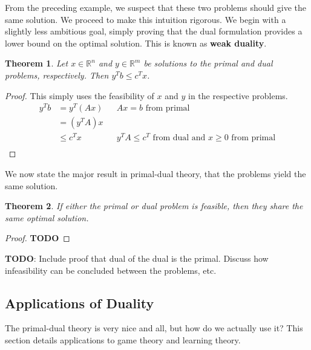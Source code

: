 \documentclass[12pt]{article}
\newcommand{\R}{\mathcal{R}}
\def\R{\mathbb{R}}
\newtheorem{thm}{Theorem}
\begin{document}
From the preceding example, we suspect that these two problems should give the same solution. We proceed to make this intuition rigorous. We begin with a slightly less
ambitious goal, simply proving that the dual formulation provides a lower bound on the optimal solution. This is known as \textbf{weak duality}. 

\begin{thm}
Let $x \in \R^n$ and $y \in \R^m$ be solutions to the primal and dual problems, respectively. Then $y^T b \leq c^T x$. 
\end{thm}

\begin{proof}
This simply uses the feasibility of $x$ and $y$ in the respective problems. 
\begin{align*}
y^T b &= y^T(Ax) && Ax = b \text{ from primal} \\
	 &= (y^T A)x \\
	 &\leq c^T x && y^T A \leq c^T \text{ from dual and } x \geq 0 \text{ from primal} \\
\end{align*}
\end{proof}

We now state the major result in primal-dual theory, that the problems yield the same solution. 
\begin{thm}
If either the primal or dual problem is feasible, then they share the same optimal solution. 
\end{thm}

\begin{proof}
\textbf{TODO}
\end{proof}

\textbf{TODO}: Include proof that dual of the dual is the primal. Discuss how infeasibility can be concluded between the problems, etc.  

\subsection{Applications of Duality}
The primal-dual theory is very nice and all, but how do we actually use it? This section details applications to game theory and learning theory. 
\end{document}
